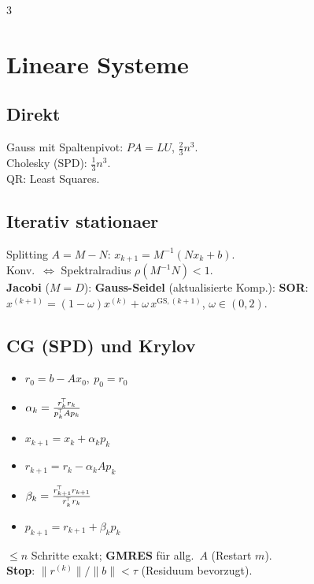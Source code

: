 \documentclass[8pt,a4paper]{extarticle}
\begin{document}
\begin{multicols*}{3}
\section{Lineare Systeme}
\subsection{Direkt}
Gauss mit Spaltenpivot: $PA=LU$, $\tfrac23 n^3$.\\
Cholesky (SPD): $\tfrac13 n^3$.\\
QR: Least Squares.

\subsection{Iterativ stationaer}
Splitting $A=M-N$: $x_{k+1}=M^{-1}(Nx_k+b)$.\\
Konv.\ $\Leftrightarrow$ Spektralradius $\rho(M^{-1}N)<1$.\\[0.3ex]
\textbf{Jacobi} ($M=D$):
\textbf{Gauss-Seidel} (aktualisierte Komp.):
\textbf{SOR}: $x^{(k+1)}=(1{-}\omega)x^{(k)}+\omega\,x^{\text{GS},(k+1)}$, $\omega\!\in\!(0,2)$.\\

\subsection{CG (SPD) und Krylov}
\begin{itemize}
\item $r_0=b-Ax_0,\ p_0=r_0$
\item $\alpha_k=\frac{r_k^{\!\top} r_k}{p_k^{\!\top} A p_k}$
\item $x_{k+1}=x_k+\alpha_k p_k$
\item $r_{k+1}=r_k-\alpha_k A p_k$
\item $\beta_k=\frac{r_{k+1}^{\!\top} r_{k+1}}{r_k^{\!\top} r_k}$
\item $p_{k+1}=r_{k+1}+\beta_k p_k$
\end{itemize}
$\le n$ Schritte exakt; \textbf{GMRES} f\"ur allg.\ $A$ (Restart $m$).\\
\textbf{Stop}: $\|r^{(k)}\|/\|b\|<\tau$ (Residuum bevorzugt).


\end{multicols*}
\end{document}
